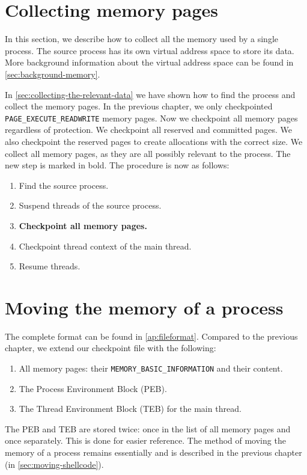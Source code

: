 \documentclass[a4paper, 11pt, english]{report}
\begin{document}
\section{Collecting memory pages}
\label{sec:collecting-memory}
In this section, we describe how to collect all the memory used by a single process. The source process has its own virtual address space to store its data. More background information about the virtual address space can be found in \autoref{sec:background-memory}.

In \autoref{sec:collecting-the-relevant-data} we have shown how to find the process and collect the memory pages. In the previous chapter, we only checkpointed \texttt{PAGE\_EXECUTE\_READWRITE} memory pages. Now we checkpoint all memory pages regardless of protection. We checkpoint all reserved and committed pages. We also checkpoint the reserved pages to create allocations with the correct size. We collect all memory pages, as they are all possibly relevant to the process. The new step is marked in bold. The procedure is now as follows:

\begin{enumerate}
	\item Find the source process.
	\item Suspend threads of the source process.
	\item \textbf{Checkpoint all memory pages.}
	\item Checkpoint thread context of the main thread.
	\item Resume threads.
\end{enumerate}


\section{Moving the memory of a process}
\label{sec:moving-memory}
The complete format can be found in \autoref{ap:fileformat}. Compared to the previous chapter, we extend our checkpoint file with the following: 

\begin{enumerate}[]
	\item All memory pages: their \texttt{MEMORY\_BASIC\_INFORMATION} and their content.
	\item The Process Environment Block (PEB).
	\item The Thread Environment Block (TEB) for the main thread.
\end{enumerate}

The PEB and TEB are stored twice: once in the list of all memory pages and once separately. This is done for easier reference. The method of moving the memory of a process remains essentially and is described in the previous chapter (in \autoref{sec:moving-shellcode}). 
\end{document}
